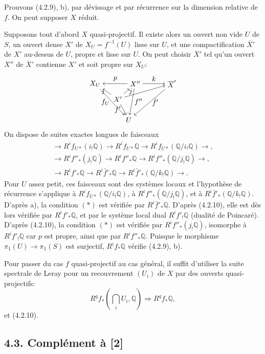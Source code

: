 \documentclass[10pt]{article}
\newcommand{\Q}{\mathbb Q}
\begin{document}
Prouvons (4.2.9), b), par dévissage et par récurrence sur la dimension relative de $f$. On peut supposer $X$ réduit.

Supposons tout d'abord $X$ quasi-projectif. Il existe alors un ouvert non vide $U$ de $S$, un ouvert dense $X'$ de $X_U=f^{-1}(U)$ lisse sur $U$, et une compactification $\overline X'$ de $X'$ au-dessus de $U$, propre et lisse sur $U$. On peut choisir $\overline X'$ tel qu'un ouvert $X''$ de $\overline X'$ contienne $X'$ et soit propre sur $X_U$:
\[
\begin{tikzpicture}[scale=.9,baseline=(current bounding box.center)]
\node (XU) at (0,2) {$X_U$};
\node (Xpp) at (2.2,2) {$X''$};
\node (Xbar) at (4.2,2) {$\overline X'$};
\node (Xp) at (1.25,1.15) {$X'$};
\node (U) at (1.85,0) {$U$};
\draw[->] (Xpp)--node[above] {$p$} (XU);
\draw[->] (Xpp)--node[above] {$k$} (Xbar);
\draw[->] (Xp)--node[left] {$i$} (XU);
\draw[->] (Xp)--node[right] {$j$} (Xpp);
\draw[->] (Xp)--(Xbar);
\draw[->] (XU)--node[left] {$f_U$} (U);
\draw[->] (Xp)--node[left] {$f'$} (U);
\draw[->] (Xpp)--node[right] {$f''$} (U);
\draw[->] (Xbar)--node[right] {$\bar f'$} (U);
\end{tikzpicture}
\]
On dispose de suites exactes longues de faisceaux
\[
\begin{gathered}
\to R^if_{U*}(i_!\Q)\to R^if_{U*}\Q\to R^if_{U*}(\Q/i_!\Q)\to,\\
\to R^if''_*(j_!\Q)\to R^if''_*\Q\to R^if''_*(\Q/j_!\Q)\to,\\
\to R^if'_*\Q\to R^i\bar f'_*\Q\to R^i\bar f'_*(\Q/k_!\Q)\to .
\end{gathered}
\]
Pour $U$ assez petit, ces faisceaux sont des systèmes locaux et l'hypothèse de récurrence s'applique à $R^if_{U*}(\Q/i_!\Q)$, à $R^if''_*(\Q/j_!\Q)$, et à $R^i\bar f'_*(\Q/k_!\Q)$. D'après a), la condition $(*)$ est vérifiée par $R^i\bar f'_*\Q$. D'après (4.2.10), elle est dès lors vérifiée par $R^if'_*\Q$, et par le système local dual $R^if'_!\Q$ (dualité de Poincaré). D'après (4.2.10), la condition $(*)$ est vérifiée par $R^if''_*(j_!\Q)$, isomorphe à $R^if'_!\Q$ car $p$ est propre, ainsi que par $R^if''_*\Q$. Puisque le morphisme $\pi_1(U)\to\pi_1(S)$ est surjectif, $R^if_*\Q$ vérifie (4.2.9), b).

Pour passer du cas $f$ quasi-projectif au cas général, il suffit d'utiliser la suite spectrale de Leray pour un recouvrement $(U_i)$ de $X$ par des ouverts quasi-projectifs:
\[
R^qf_*(\bigcap_iU_i,\Q)\Longrightarrow R^qf_*\Q,
\]
et (4.2.10).

\subsection*{4.3. Complément à [2]}
\end{document}
